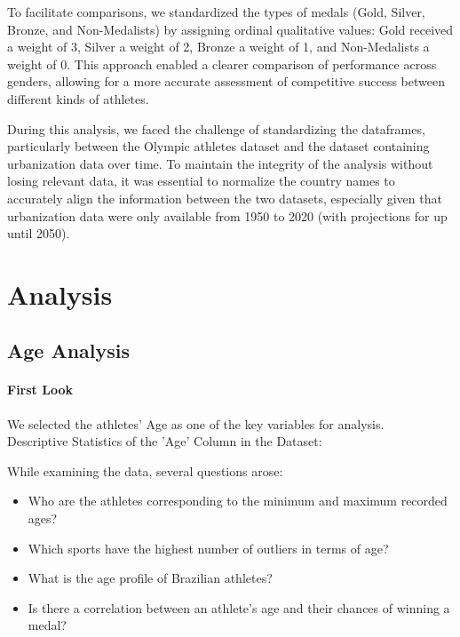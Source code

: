 \documentclass{article}
\begin{document}
To facilitate comparisons, we standardized the types of medals (Gold, Silver, Bronze, and Non-Medalists) by assigning ordinal qualitative values: Gold received a weight of 3, Silver a weight of 2, Bronze a weight of 1, and Non-Medalists a weight of 0. This approach enabled a clearer comparison of performance across genders, allowing for a more accurate assessment of competitive success between different kinds of athletes.

During this analysis, we faced the challenge of standardizing the dataframes, particularly between the Olympic athletes dataset and the dataset containing urbanization data over time. To maintain the integrity of the analysis without losing relevant data, it was essential to normalize the country names to accurately align the information between the two datasets, especially given that urbanization data were only available from 1950 to 2020 (with projections for up until 2050).

\section{Analysis}

\subsection{Age Analysis}
\paragraph{First Look}
We selected the athletes' Age as one of the key variables for analysis. \\
Descriptive Statistics of the 'Age' Column in the Dataset:

\bigskip
{}
\bigskip

While examining the data, several questions arose:
\begin{itemize}
    \item Who are the athletes corresponding to the minimum and maximum recorded ages?
    \item Which sports have the highest number of outliers in terms of age?
    \item What is the age profile of Brazilian athletes?
    \item Is there a correlation between an athlete's age and their chances of winning a medal?
\end{itemize}
\end{document}

